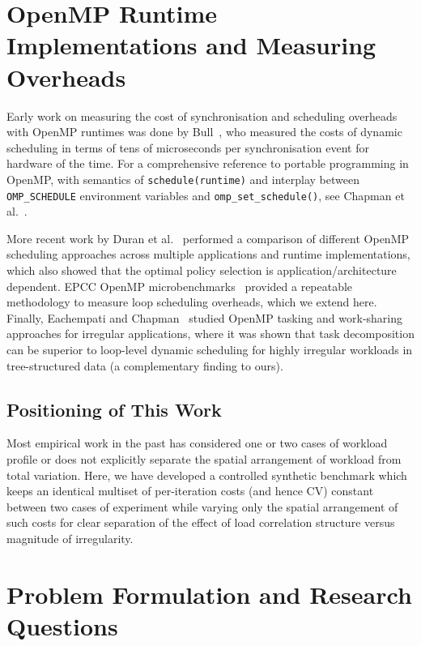 \documentclass[conference]{IEEEtran}
\begin{document}
\section{OpenMP Runtime Implementations and Measuring Overheads}

Early work on measuring the cost of synchronisation and scheduling overheads with OpenMP runtimes was done by Bull~\cite{bull1999measuring}, who measured the costs of dynamic scheduling in terms of tens of microseconds per synchronisation event for hardware of the time. For a comprehensive reference to portable programming in OpenMP, with semantics of \texttt{schedule(runtime)} and interplay between \texttt{OMP\_SCHEDULE} environment variables and \texttt{omp\_set\_schedule()}, see Chapman et al.~\cite{chapman2007using}.

More recent work by Duran et al.~\cite{duran2008openmp} performed a comparison of different OpenMP scheduling approaches across multiple applications and runtime implementations, which also showed that the optimal policy selection is application/architecture dependent. EPCC OpenMP microbenchmarks~\cite{markbull2001epcc} provided a repeatable methodology to measure loop scheduling overheads, which we extend here. Finally, Eachempati and Chapman~\cite{eachempati2010evaluating} studied OpenMP tasking and work-sharing approaches for irregular applications, where it was shown that task decomposition can be superior to loop-level dynamic scheduling for highly irregular workloads in tree-structured data (a complementary finding to ours).

\subsection{Positioning of This Work}

Most empirical work in the past has considered one or two cases of workload profile or does not explicitly separate the spatial arrangement of workload from total variation. Here, we have developed a controlled synthetic benchmark which keeps an identical multiset of per-iteration costs (and hence CV) constant between two cases of experiment while varying only the spatial arrangement of such costs for clear separation of the effect of load correlation structure versus magnitude of irregularity.

\section{Problem Formulation and Research Questions}
\end{document}
